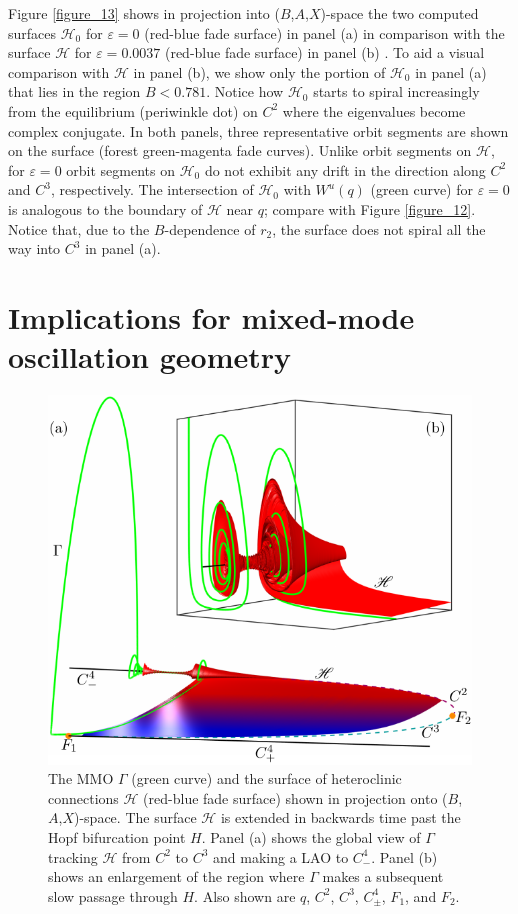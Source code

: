 \documentclass{ws-ijbc}
\begin{document}
Figure \ref{figure_13} shows in projection into ($B$,$A$,$X$)-space the two computed surfaces $\mathscr{H}_0$ for $\varepsilon=0$ (red-blue fade surface) in panel (a) in comparison with the surface $\mathscr{H}$ for $\varepsilon=0.0037$ (red-blue fade surface) in panel (b) .  To aid a visual comparison with $\mathscr{H}$ in panel (b), we show only the portion of $\mathscr{H}_0$ in panel (a) that lies in the region $B < 0.781$.  Notice how $\mathscr{H}_0$ starts to spiral increasingly from the equilibrium (periwinkle dot) on $C^2$ where the eigenvalues become complex conjugate.  In both panels, three representative orbit segments are shown on the surface (forest green-magenta fade curves).  Unlike orbit segments on $\mathscr{H}$, for $\varepsilon=0$ orbit segments on $\mathscr{H}_0$ do not exhibit any drift in the direction along $C^2$ and $C^3$, respectively.  The intersection of $\mathscr{H}_0$ with $W^u(q)$ (green curve) for $\varepsilon=0$ is analogous to the boundary of $\mathscr{H}$ near $q$; compare with Figure \ref{figure_12}.  Notice that, due to the $B$-dependence of $r_2$, the surface does not spiral all the way into $C^3$ in panel (a).

\section{Implications for mixed-mode oscillation geometry}

\begin{figure}[H]
\centering
\includegraphics[]{./figures/MKMO_17.pdf}
\caption{The MMO $\Gamma$ (green curve) and the surface of heteroclinic connections $\mathscr{H}$ (red-blue fade surface) shown in projection onto ($B$,$A$,$X$)-space. The surface $\mathscr{H}$ is extended in backwards time past the Hopf bifurcation point $H$.  Panel (a) shows the global view of $\Gamma$ tracking $\mathscr{H}$ from $C^2$ to $C^3$ and making a LAO to $C^4_-$.  Panel (b) shows an enlargement of the region where $\Gamma$ makes a subsequent slow passage through $H$.  Also shown are $q$, $C^2$, $C^3$, $C^4_\pm$, $F_1$, and $F_2$.}
\label{figure_17}
\end{figure}
\end{document}

